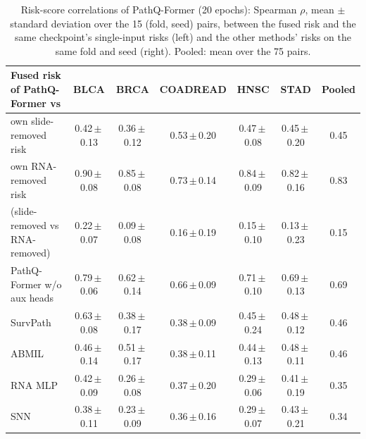 \documentclass{article}
\newcommand{\pq}{PathQ-Former}
\newcommand{\pmv}[2]{#1\,$\pm$\,#2}
\begin{document}
\begin{table}[htbp]
\caption{Risk-score correlations of \pq{} (20 epochs): Spearman $\rho$, mean $\pm$ standard deviation over the 15 (fold, seed) pairs, between the fused risk and the same checkpoint's single-input risks (left) and the other methods' risks on the same fold and seed (right). Pooled: mean over the 75 pairs.}
\label{tab:corr}
\centering
\footnotesize
\begin{tabular}{@{}lcccccc@{}}
\toprule
Fused risk of \pq{} vs & BLCA & BRCA & COADREAD & HNSC & STAD & Pooled \\
\midrule
own slide-removed risk & \pmv{0.42}{0.13} & \pmv{0.36}{0.12} & \pmv{0.53}{0.20} & \pmv{0.47}{0.08} & \pmv{0.45}{0.20} & 0.45 \\
own RNA-removed risk & \pmv{0.90}{0.08} & \pmv{0.85}{0.08} & \pmv{0.73}{0.14} & \pmv{0.84}{0.09} & \pmv{0.82}{0.16} & 0.83 \\
\quad (slide-removed vs RNA-removed) & \pmv{0.22}{0.07} & \pmv{0.09}{0.08} & \pmv{0.16}{0.19} & \pmv{0.15}{0.10} & \pmv{0.13}{0.23} & 0.15 \\
\midrule
\pq{} w/o aux heads & \pmv{0.79}{0.06} & \pmv{0.62}{0.14} & \pmv{0.66}{0.09} & \pmv{0.71}{0.10} & \pmv{0.69}{0.13} & 0.69 \\
SurvPath & \pmv{0.63}{0.08} & \pmv{0.38}{0.17} & \pmv{0.38}{0.09} & \pmv{0.45}{0.24} & \pmv{0.48}{0.12} & 0.46 \\
ABMIL & \pmv{0.46}{0.14} & \pmv{0.51}{0.17} & \pmv{0.38}{0.11} & \pmv{0.44}{0.13} & \pmv{0.48}{0.11} & 0.46 \\
RNA MLP & \pmv{0.42}{0.09} & \pmv{0.26}{0.08} & \pmv{0.37}{0.20} & \pmv{0.29}{0.06} & \pmv{0.41}{0.19} & 0.35 \\
SNN & \pmv{0.38}{0.11} & \pmv{0.23}{0.09} & \pmv{0.36}{0.16} & \pmv{0.29}{0.07} & \pmv{0.43}{0.21} & 0.34 \\
\bottomrule
\end{tabular}
\end{table}
\end{document}
